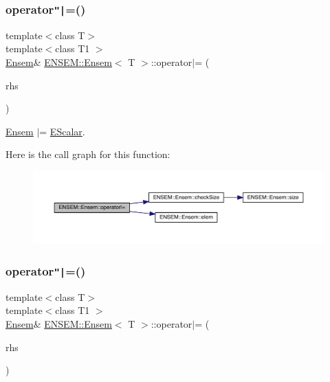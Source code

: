 \subsubsection{\texorpdfstring{operator\texttt{"|}=()}{operator|=()}\hspace{0.1cm}{\footnotesize\ttfamily [1/2]}}
{\footnotesize\ttfamily template$<$class T$>$ \\
template$<$class T1 $>$ \\
\mbox{\hyperlink{classENSEM_1_1Ensem}{Ensem}}\& \mbox{\hyperlink{classENSEM_1_1Ensem}{E\+N\+S\+E\+M\+::\+Ensem}}$<$ T $>$\+::operator$\vert$= (\begin{DoxyParamCaption}\item[{const \mbox{\hyperlink{classENSEM_1_1EScalar}{E\+Scalar}}$<$ T1 $>$ \&}]{rhs }\end{DoxyParamCaption})\hspace{0.3cm}{\ttfamily [inline]}}



\mbox{\hyperlink{classENSEM_1_1Ensem}{Ensem}} $\vert$= \mbox{\hyperlink{classENSEM_1_1EScalar}{E\+Scalar}}. 

Here is the call graph for this function\+:
\nopagebreak
\begin{figure}[H]
\begin{center}
\leavevmode
\includegraphics[width=350pt]{d7/d3e/classENSEM_1_1Ensem_aa0c3f80e393be46c6f0a1cb3bbdfb170_cgraph}
\end{center}
\end{figure}
\mbox{\label{classENSEM_1_1Ensem_aa0c3f80e393be46c6f0a1cb3bbdfb170}} 
\subsubsection{\texorpdfstring{operator\texttt{"|}=()}{operator|=()}\hspace{0.1cm}{\footnotesize\ttfamily [2/2]}}
{\footnotesize\ttfamily template$<$class T$>$ \\
template$<$class T1 $>$ \\
\mbox{\hyperlink{classENSEM_1_1Ensem}{Ensem}}\& \mbox{\hyperlink{classENSEM_1_1Ensem}{E\+N\+S\+E\+M\+::\+Ensem}}$<$ T $>$\+::operator$\vert$= (\begin{DoxyParamCaption}\item[{const \mbox{\hyperlink{classENSEM_1_1EScalar}{E\+Scalar}}$<$ T1 $>$ \&}]{rhs }\end{DoxyParamCaption})\hspace{0.3cm}{\ttfamily [inline]}}



